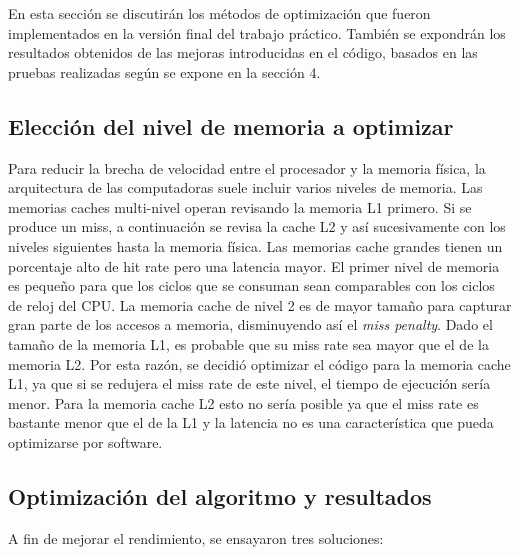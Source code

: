 \documentclass[a4paper,10pt]{article}
\begin{document}
En esta secci\'on se discutir\'an los m\'etodos de optimizaci\'on que fueron implementados en la versi\'on final del trabajo pr\'actico. Tambi\'en se expondr\'an los resultados obtenidos de las mejoras introducidas en el c\'odigo, basados en las pruebas realizadas seg\'un se expone en la secci\'on 4.

\subsection{Elecci\'on del nivel de memoria a optimizar}
Para reducir la brecha de velocidad entre el procesador y la memoria f\'isica,
la arquitectura de las computadoras suele incluir varios niveles de memoria. Las memorias caches multi-nivel operan 
revisando la memoria L1 primero. Si se produce un miss, a continuaci\'on se revisa la cache L2 y as\'i sucesivamente con los niveles siguientes 
hasta la memoria f\'isica. Las memorias cache grandes tienen un porcentaje alto de hit rate pero una latencia mayor. El primer nivel de memoria 
es peque\~no para que los ciclos que se consuman sean comparables con los ciclos de reloj del CPU. La memoria cache de nivel 2 es de mayor tama\~no para 
capturar gran parte de los accesos a memoria, disminuyendo as\'i el \textit{miss penalty}. Dado el tama\~no de la memoria L1, es probable que su miss rate sea mayor que 
el de la memoria L2.  Por esta raz\'on, se decidi\'o optimizar el c\'odigo para la memoria cache L1, ya que si se redujera el miss rate de este nivel, el tiempo de 
ejecuci\'on ser\'ia menor. Para la memoria cache L2 esto no ser\'ia posible ya que el miss rate es bastante menor que el de la L1 y la latencia no 
es una caracter\'istica que pueda optimizarse por software.

\subsection{Optimizaci\'on del algoritmo y resultados}

A fin de mejorar el rendimiento, se ensayaron tres soluciones:\\
\end{document}
